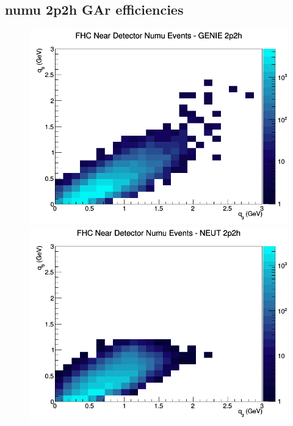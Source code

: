 \documentclass[12pt]{article}
\begin{document}
\subsection{numu 2p2h GAr efficiencies}
\begin{figure}[h]
\includegraphics[width=\linewidth]{eff_q0_q3/GAr/2p2h_FHC_ND_numu_q3_q0_GENIE.png}
\endminipage
{}
\includegraphics[width=\linewidth]{eff_q0_q3/GAr/2p2h_FHC_ND_numu_q3_q0_NEUT.png}
\endminipage
{}

\end{figure}
\end{document}

